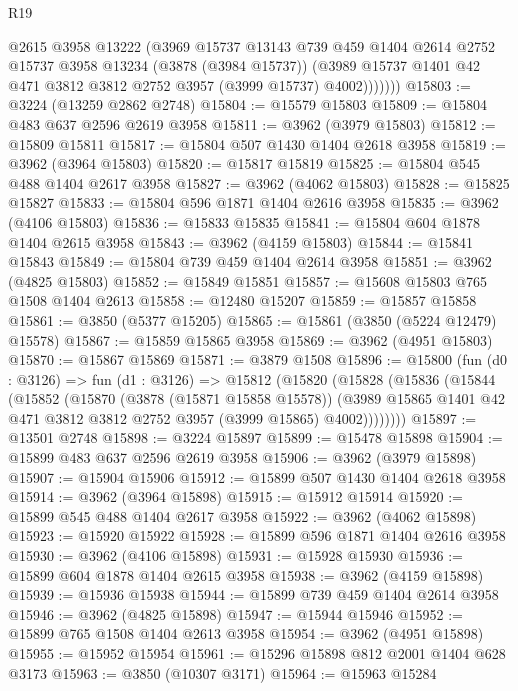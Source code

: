 \begin{lexlean}{R19}
\begin{coremodule}
              @2615
              @3958
              @13222
              (@3969
                @15737
                @13143
                @739
                @459
                @1404
                @2614
                @2752
                @15737
                @3958
                @13234
                (@3878 (@3984 @15737))
                (@3989 @15737 @1401 @42 @471 @3812 @3812 @2752 @3957 (@3999 @15737) @4002)))))))
@15803 := @3224 (@13259 @2862 @2748)
@15804 := @15579 @15803
@15809 := @15804 @483 @637 @2596 @2619 @3958
@15811 := @3962 (@3979 @15803)
@15812 := @15809 @15811
@15817 := @15804 @507 @1430 @1404 @2618 @3958
@15819 := @3962 (@3964 @15803)
@15820 := @15817 @15819
@15825 := @15804 @545 @488 @1404 @2617 @3958
@15827 := @3962 (@4062 @15803)
@15828 := @15825 @15827
@15833 := @15804 @596 @1871 @1404 @2616 @3958
@15835 := @3962 (@4106 @15803)
@15836 := @15833 @15835
@15841 := @15804 @604 @1878 @1404 @2615 @3958
@15843 := @3962 (@4159 @15803)
@15844 := @15841 @15843
@15849 := @15804 @739 @459 @1404 @2614 @3958
@15851 := @3962 (@4825 @15803)
@15852 := @15849 @15851
@15857 := @15608 @15803 @765 @1508 @1404 @2613
@15858 := @12480 @15207
@15859 := @15857 @15858
@15861 := @3850 (@5377 @15205)
@15865 := @15861 (@3850 (@5224 @12479) @15578)
@15867 := @15859 @15865 @3958
@15869 := @3962 (@4951 @15803)
@15870 := @15867 @15869
@15871 := @3879 @1508
@15896 := @15800
    (fun (d0 : @3126) =>
    fun (d1 : @3126) =>
    @15812
      (@15820
        (@15828
          (@15836
            (@15844
              (@15852
                (@15870
                  (@3878 (@15871 @15858 @15578))
                  (@3989 @15865 @1401 @42 @471 @3812 @3812 @2752 @3957 (@3999 @15865) @4002))))))))
@15897 := @13501 @2748
@15898 := @3224 @15897
@15899 := @15478 @15898
@15904 := @15899 @483 @637 @2596 @2619 @3958
@15906 := @3962 (@3979 @15898)
@15907 := @15904 @15906
@15912 := @15899 @507 @1430 @1404 @2618 @3958
@15914 := @3962 (@3964 @15898)
@15915 := @15912 @15914
@15920 := @15899 @545 @488 @1404 @2617 @3958
@15922 := @3962 (@4062 @15898)
@15923 := @15920 @15922
@15928 := @15899 @596 @1871 @1404 @2616 @3958
@15930 := @3962 (@4106 @15898)
@15931 := @15928 @15930
@15936 := @15899 @604 @1878 @1404 @2615 @3958
@15938 := @3962 (@4159 @15898)
@15939 := @15936 @15938
@15944 := @15899 @739 @459 @1404 @2614 @3958
@15946 := @3962 (@4825 @15898)
@15947 := @15944 @15946
@15952 := @15899 @765 @1508 @1404 @2613 @3958
@15954 := @3962 (@4951 @15898)
@15955 := @15952 @15954
@15961 := @15296 @15898 @812 @2001 @1404 @628 @3173
@15963 := @3850 (@10307 @3171)
@15964 := @15963 @15284

\end{coremodule}
\end{lexlean}
